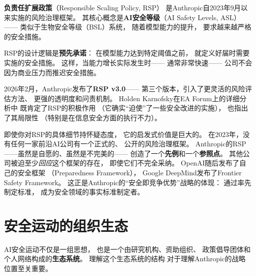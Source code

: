 \textbf{负责任扩展政策}（Responsible Scaling Policy, RSP）
是Anthropic自2023年9月以来实施的风险治理框架。
其核心概念是\textbf{AI安全等级}（AI Safety Levels, ASL）——
类似于生物安全等级（BSL）系统，
随着模型能力的提升，
要求越来越严格的安全措施。

RSP的设计逻辑是\textbf{预先承诺}：
在模型能力达到特定阈值之前，
就定义好届时需要实施的安全措施。
这样，当能力增长实际发生时——
通常非常快速——
公司不会因为商业压力而推迟安全措施。

2026年2月，Anthropic发布了\textbf{RSP v3.0}——
第三个版本，引入了更灵活的风险评估方法、
更强的透明度和问责机制。
Holden Karnofsky在EA Forum上的详细分析中
既肯定了RSP的积极作用
（它确实``迫使''了一些安全改进的实施），
也指出了其局限性
（特别是在信息安全方面的执行不力）。

\begin{corebox}[RSP的启发式价值]
即使你对RSP的具体细节持怀疑态度，
它的启发式价值是巨大的。
在2023年，没有任何一家前沿AI公司有一个正式的、
公开的风险治理框架。
Anthropic的RSP——虽然是自愿的、虽然是不完美的——
创造了一个\textbf{先例}和一个\textbf{参照点}。
其他公司被迫至少\textit{回应}这个框架的存在，
即使它们不完全采纳。
OpenAI随后发布了自己的安全框架
（Preparedness Framework），
Google DeepMind发布了Frontier Safety Framework。
这正是Anthropic的``安全即竞争优势''战略的体现：
通过率先制定标准，
成为安全领域的事实标准制定者。
\end{corebox}


\section{安全运动的组织生态}
\label{sec:safety-ecosystem}

AI安全运动不仅是一组思想，
也是一个由研究机构、资助组织、
政策倡导团体和个人网络构成的\textbf{生态系统}。
理解这个生态系统的结构
对于理解Anthropic的战略位置至关重要。

